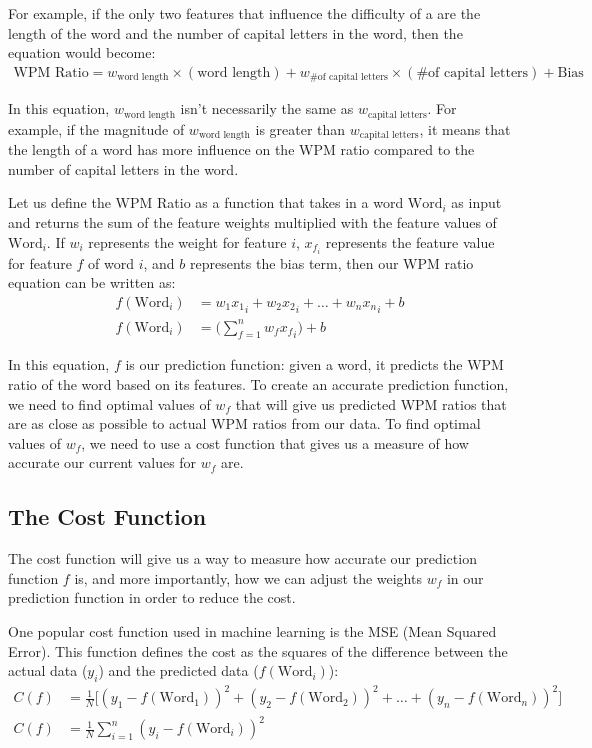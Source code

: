 \documentclass[12pt]{article}
\begin{document}
For example, if the only two features that influence the difficulty of a are the length of the word and the number of capital letters in the word, then the equation would become:
\begin{align*}
	\text{WPM Ratio} = w_{\text{word length}} \times (\text{word length}) + w_{\text{\# of capital letters}} \times (\text{\# of capital letters}) + \text{Bias}
\end{align*}

In this equation, $w_{\text{word length}}$ isn't necessarily the same as $w_{\text{capital letters}}$. For example, if the magnitude of $w_{\text{word length}}$ is greater than $w_{\text{capital letters}}$, it means that the length of a word has more influence on the WPM ratio compared to the number of capital letters in the word.

Let us define the WPM Ratio as a function that takes in a word $\text{Word}_i$ as input and returns the sum of the feature weights multiplied with the feature values of $\text{Word}_i$. If $w_i$ represents the weight for feature $i$, $x_{f_i}$ represents the feature value for feature $f$ of word $i$, and $b$ represents the bias term, then our WPM ratio equation can be written as:
\begin{align*}
	f(\text{Word}_i) & = w_1{x_1}_i + w_2{x_2}_i + \dots + w_n{x_n}_i + b
	\\
	f(\text{Word}_i) & = \Big(\sum_{f=1}^{n} w_f{x_f}_i\Big) + b
\end{align*}

In this equation, $f$ is our prediction function: given a word, it predicts the WPM ratio of the word based on its features. To create an accurate prediction function, we need to find optimal values of $w_f$ that will give us predicted WPM ratios that are as close as possible to actual WPM ratios from our data. To find optimal values of $w_f$, we need to use a cost function that gives us a measure of how accurate our current values for $w_f$ are.

\subsection*{The Cost Function}

The cost function will give us a way to measure how accurate our prediction function $f$ is, and more importantly, how we can adjust the weights $w_f$ in our prediction function in order to reduce the cost.

One popular cost function used in machine learning is the MSE (Mean Squared Error). This function defines the cost as the squares of the difference between the actual data ($y_i$) and the predicted data ($f(\text{Word}_i)$):
\begin{align*}
	C(f) & = \frac{1}{N}\big[(y_1 - f(\text{Word}_1))^2 + (y_2 - f(\text{Word}_2))^2 + \dots + (y_n - f(\text{Word}_n))^2]
	\\
	C(f) & = \frac{1}{N} \sum_{i=1}^{n} (y_i - f(\text{Word}_i))^2
\end{align*}
\end{document}
